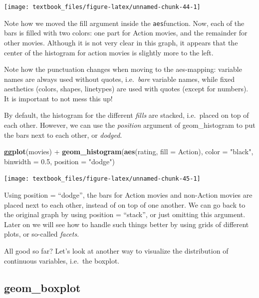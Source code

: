 \documentclass[]{tufte-book}
\newenvironment{Shaded}{}{}
\newcommand{\DataTypeTok}[1]{\textcolor[rgb]{0.56,0.13,0.00}{#1}}
\newcommand{\FloatTok}[1]{\textcolor[rgb]{0.25,0.63,0.44}{#1}}
\newcommand{\KeywordTok}[1]{\textcolor[rgb]{0.00,0.44,0.13}{\textbf{#1}}}
\newcommand{\NormalTok}[1]{#1}
\newcommand{\OperatorTok}[1]{\textcolor[rgb]{0.40,0.40,0.40}{#1}}
\newcommand{\StringTok}[1]{\textcolor[rgb]{0.25,0.44,0.63}{#1}}
\begin{document}
\texttt{[image: textbook\_files/figure-latex/unnamed-chunk-44-1]}

Note how we moved the fill argument inside the \texttt{aes}function. Now, each of the bars is filled with two colors: one part for Action movies, and the remainder for other movies. Although it is not very clear in this graph, it appears that the center of the histogram for action movies is slightly more to the left.

Note how the punctuation changes when moving to the aes-mapping: variable names are always used without quotes, i.e.~\emph{bare} variable names, while fixed aesthetics (colors, shapes, linetypes) are used with quotes (except for numbers). It is important to not mess this up!

By default, the histogram for the different \emph{fills} are stacked, i.e.~placed on top of each other. However, we can use the \emph{position} argument of geom\_histogram to put the bars next to each other, or \emph{dodged}.

\begin{Shaded}
\begin{Highlighting}[]
\KeywordTok{ggplot}\NormalTok{(movies) }\OperatorTok{+}
\StringTok{    }\KeywordTok{geom_histogram}\NormalTok{(}\KeywordTok{aes}\NormalTok{(rating, }\DataTypeTok{fill =}\NormalTok{ Action), }
                   \DataTypeTok{color =} \StringTok{"black"}\NormalTok{, }\DataTypeTok{binwidth =} \FloatTok{0.5}\NormalTok{, }\DataTypeTok{position =} \StringTok{"dodge"}\NormalTok{)}
\end{Highlighting}
\end{Shaded}

\texttt{[image: textbook\_files/figure-latex/unnamed-chunk-45-1]}

Using position = ``dodge'', the bars for Action movies and non-Action movies are placed next to each other, instead of on top of one another. We can go back to the original graph by using position = ``stack'', or just omitting this argument. Later on we will see how to handle such things better by using grids of different plots, or so-called \emph{facets}.

All good so far? Let's look at another way to visualize the distribution of continuous variables, i.e.~the boxplot.

\hypertarget{geom_boxplot}{%
\subsection{geom\_boxplot}\label{geom_boxplot}}
\end{document}
